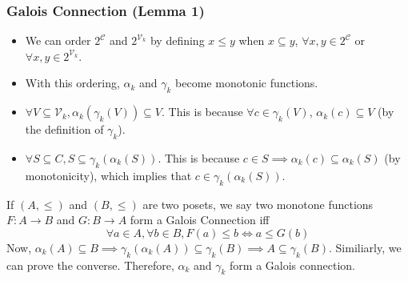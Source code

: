 \documentclass{beamer}
\begin{document}
{        \begin{frame}
            \frametitle{Galois Connection (Lemma 1)}
            \begin{itemize}
                \item We can order $2^{\mathcal{C}}$ and $2^{\mathcal{V}_{k}}$ by defining $x \leq y$ when $x \subseteq y$, $\forall x, y \in 2^{\mathcal{C}}$ or $\forall x, y \in 2^{\mathcal{V}_{k}}$.
                \item With this ordering, $\alpha_{k}$ and $\gamma_{k}$ become monotonic functions.
                \item $\forall V \subseteq \mathcal{V}_{k}, \alpha_{k}(\gamma_{k}(V)) \subseteq V$. This is because $\forall c \in \gamma_{k}(V)$, $\alpha_{k}(c) \subseteq V$ (by the definition of $\gamma_{k}$).
                \item $\forall S \subseteq C, S \subseteq \gamma_{k}(\alpha_{k}(S))$. This is because $c \in S \implies \alpha_{k}(c) \subseteq \alpha_{k}(S)$ (by monotonicity), which implies that $c \in \gamma_{k}(\alpha_{k}(S))$.
            \end{itemize}
            If $(A, \leq)$ and $(B, \leq)$ are two posets, we say two monotone functions $F: A \rightarrow B$ and $G: B \rightarrow A$ form a Galois Connection iff
            \begin{equation*}
                \forall a \in A, \forall b \in B, F(a) \leq b \Leftrightarrow a \leq G(b)
            \end{equation*}
            Now, $\alpha_{k}(A) \subseteq B \implies \gamma_{k}(\alpha_{k}(A)) \subseteq \gamma_{k}(B) \implies A \subseteq \gamma_{k}(B)$. Similiarly, we can prove the converse. Therefore, $\alpha_{k}$ and $\gamma_{k}$ form a Galois connection.
        \end{frame}

}
\end{document}
